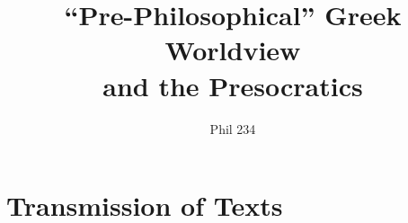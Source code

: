 \documentclass[11pt]{article}
\begin{document}
\author{Phil 234}
\title{``Pre-Philosophical'' Greek Worldview\\ and the Presocratics}
\maketitle
\thispagestyle{empty}\vspace*{3mm}

\section*{\textbf{Transmission of Texts}}
\end{document}
